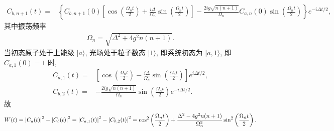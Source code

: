 \documentclass{assignment}
\begin{document}
\begin{sol}
\begin{align}
        C_{b,n+1}(t)=&\left\{C_{b,n+1}(0)\left[\cos\left(\frac{\Omega_nt}{2}\right)+\frac{i\Delta}{\Omega_n}\sin\left(\frac{\Omega_nt}{2}\right)\right]-\frac{2ig\sqrt{n(n+1)}}{\Omega_n}C_{a,n}(0)\sin\left(\frac{\Omega_nt}{2}\right)\right\}e^{-i\Delta t/2},
    \end{align}
    其中振荡频率
    \begin{align}
        \Omega_n=\sqrt{\Delta^2+4g^2n(n+1)}.
    \end{align}
    当初态原子处于上能级 $\lvert a\rangle$, 光场处于粒子数态 $\lvert 1\rangle$, 即系统初态为 $\lvert a,1\rangle$, 即 $C_{a,1}(0)=1$ 时,
    \begin{align}
        C_{a,1}(t)=&\left[\cos\left(\frac{\Omega_nt}{2}\right)-\frac{i\Delta}{\Omega_n}\sin\left(\frac{\Omega_nt}{2}\right)\right]e^{i\Delta t/2},\\
        C_{b,2}(t)=&-\frac{2ig\sqrt{n(n+1)}}{\Omega_n}\sin\left(\frac{\Omega_nt}{2}\right)e^{-i\Delta t/2}.
    \end{align}
    故
    \begin{align}
        W(t)=\left\lvert C_a(t)\right\rvert^2-\left\lvert C_b(t)\right\rvert^2=\left\lvert C_{a,1}(t)\right\rvert^2-\left\lvert C_{b,2}(t)\right\rvert^2=\cos^2\left(\frac{\Omega_nt}{2}\right)+\frac{\Delta^2-4g^2n(n+1)}{\Omega_n^2}\sin^2\left(\frac{\Omega_nt}{2}\right).
    \end{align}
\end{sol}
\end{document}
